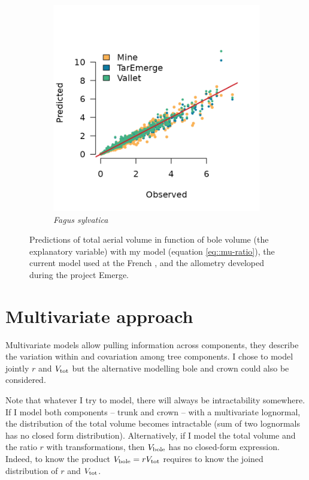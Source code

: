 \begin{figure}[h]
\begin{subfigure}{0.4\textwidth}
		\includegraphics{./Figures/fagSyl-pred.png}
		\caption{\textit{Fagus sylvatica}}
	\end{subfigure}
	\caption{Predictions of total aerial volume in function of bole volume (the explanatory variable) with my model (equation \eqref{eq::mu-ratio}), the current model used at the French \NFI \parencite{Vallet2006}, and the allometry developed during the project Emerge.}
	\label{fig::pred-ratio}
\end{figure}

\section{Multivariate approach}

Multivariate models allow pulling information across components, \ie they describe the variation within and covariation among tree components. I chose to model jointly \( r \) and \( V_{\text{tot}} \) but the alternative modelling bole and crown could also be considered.

\begin{tcolorbox}[breakable, title = Intractability]
Note that whatever I try to model, there will always be intractability somewhere. If I model both components -- trunk and crown -- with a multivariate lognormal, the distribution of the total volume becomes intractable (sum of two lognormals has no closed form distribution). Alternatively, if I model the total volume and the ratio \( r \) with transformations, then \( V_{\text{bole}} \) has no closed-form expression. Indeed, to know the product \( V_{\text{bole}} = rV_{\text{tot}} \) requires to know the joined distribution of \( r \) and \( V_{\text{tot}} \).
\end{tcolorbox}

